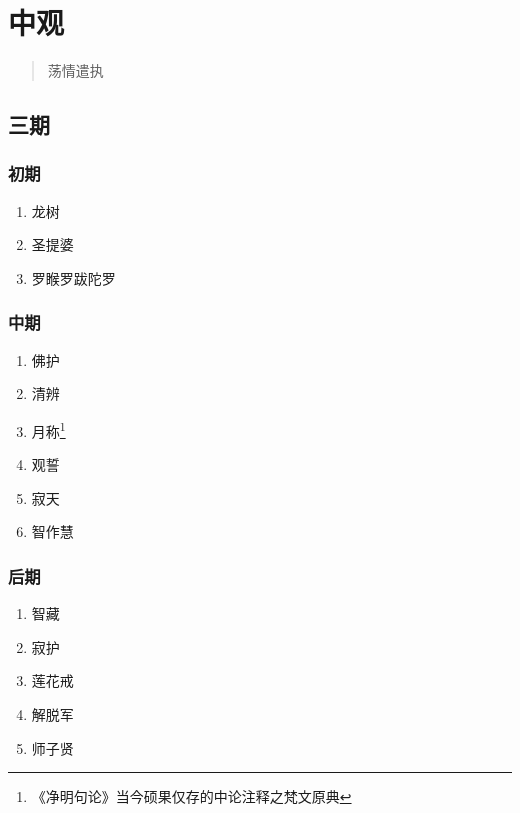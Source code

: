 \section{中观}
\begin{quote}
  荡情遣执
\end{quote}
\subsection{三期}
\subsubsection{初期}
\begin{enumerate}
  \item 龙树
  \item 圣提婆
  \item 罗睺罗跋陀罗
\end{enumerate}
\subsubsection{中期}
\begin{enumerate}
  \item 佛护
  \item 清辨
  \item 月称\footnote{《净明句论》当今硕果仅存的中论注释之梵文原典}
  \item 观誓
  \item 寂天
  \item 智作慧
\end{enumerate}
\subsubsection{后期}
\begin{enumerate}
  \item 智藏
  \item 寂护
  \item 莲花戒
  \item 解脱军
  \item 师子贤
\end{enumerate}
